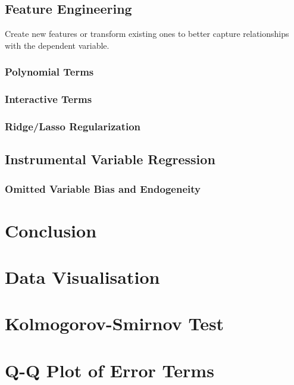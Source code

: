 \documentclass{article}
\begin{document}
\subsection{Feature Engineering}
Create new features or transform existing ones to better capture relationships with the dependent variable.
\subsubsection{Polynomial Terms}
\subsubsection{Interactive Terms}
\subsubsection{Ridge/Lasso Regularization}

\subsection{Instrumental Variable Regression}

\subsubsection{Omitted Variable Bias and Endogeneity}

\section{Conclusion}

\newpage
\clearpage
{}
\begin{appendices}

\section{Data Visualisation}

\section{Kolmogorov-Smirnov Test}

\section{Q-Q Plot of Error Terms}

\end{appendices}

\newpage


\end{document}
